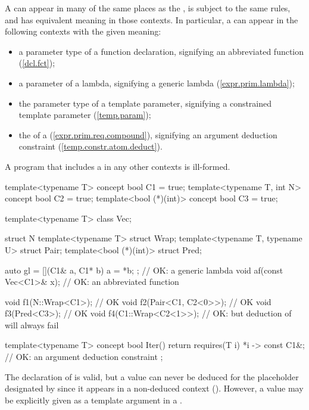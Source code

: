 \pnum
A 
can appear in many of the same places as the 
, is subject
to the same rules, and has equivalent meaning in those contexts. 
In particular, a  
can appear in the following contexts with the given meaning:
\begin{itemize}
\item a parameter type of a function declaration, signifying an 
     abbreviated function (\ref{dcl.fct});
\item a parameter of a lambda, signifying a generic lambda 
     (\ref{expr.prim.lambda});
\item the parameter type of a template parameter, signifying a
     constrained template parameter (\ref{temp.param});
\item the  of
     a 
     (\ref{expr.prim.req.compound}),
     signifying an argument deduction constraint 
     (\ref{temp.constr.atom.deduct}). 
\end{itemize}
A program that includes a 
in any other contexts is ill-formed.
% 
\enterexample
\begin{codeblock}
template<typename T> concept bool C1 = true;
template<typename T, int N> concept bool C2 = true;
template<bool (*)(int)> concept bool C3 = true;

template<typename T> class Vec;

struct N {
  template<typename T> struct Wrap;
}
template<typename T, typename U> struct Pair;
template<bool (*)(int)> struct Pred;

auto gl = [](C1& a, C1* b) { a = *b; }; // OK: a generic lambda
void af(const Vec<C1>& x);              // OK: an abbreviated function

void f1(N::Wrap<C1>);     // OK
void f2(Pair<C1, C2<0>>); // OK
void f3(Pred<C3>);        // OK
void f4(C1::Wrap<C2<1>>); // OK: but deduction of  will always fail

template<typename T> concept bool Iter() {
  return requires(T i) {
    {*i} -> const C1&; // OK: an argument deduction constraint
  };
}
\end{codeblock}
The declaration of  is valid, but a value can never be deduced 
for the placeholder designated by  since it appears in a
non-deduced context ().
However, a value may be explicitly given as a template argument in a
.
\exitexample

